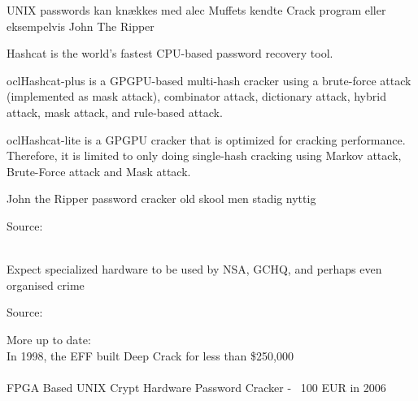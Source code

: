 \documentclass[Screen16to9,17pt]{foils}
\begin{document}
\begin{list1}
\item UNIX passwords kan knækkes med alec Muffets kendte Crack program
  eller eksempelvis John The Ripper 
\end{list1}




\begin{list2}
\item Hashcat is the world's fastest CPU-based password recovery tool.
\item oclHashcat-plus is a GPGPU-based multi-hash cracker using a brute-force attack (implemented as mask attack), combinator attack, dictionary attack, hybrid attack, mask attack, and rule-based attack.
\item oclHashcat-lite is a GPGPU cracker that is optimized for cracking performance. Therefore, it is limited to only doing single-hash cracking using Markov attack, Brute-Force attack and Mask attack.
\item John the Ripper password cracker old skool men stadig nyttig
\end{list2}

Source:\\
\\




Expect specialized hardware to be used by NSA, GCHQ, and perhaps even organised crime





Source: 

More up to date:\\
In 1998, the EFF built Deep Crack for less than \$250,000\\
\\
FPGA Based UNIX Crypt Hardware Password Cracker - ~100 EUR in 2006\\











\slidenext
\end{document}

